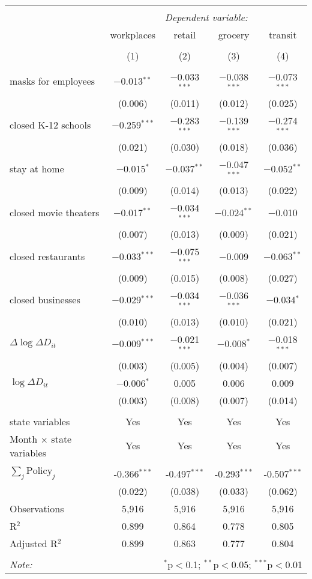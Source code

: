 \begin{tabular}{@{\extracolsep{1pt}}lcccc} 
\\[-1.8ex]\hline 
\hline \\[-1.8ex] 
 & \multicolumn{4}{c}{\textit{Dependent variable:}} \\ 
\cline{2-5} 
 & workplaces & retail & grocery & transit \\ 
\\[-1.8ex] & (1) & (2) & (3) & (4)\\ 
\hline \\[-1.8ex] 
 masks for employees & $-$0.013$^{**}$ & $-$0.033$^{***}$ & $-$0.038$^{***}$ & $-$0.073$^{***}$ \\ 
  & (0.006) & (0.011) & (0.012) & (0.025) \\ 
  closed K-12 schools & $-$0.259$^{***}$ & $-$0.283$^{***}$ & $-$0.139$^{***}$ & $-$0.274$^{***}$ \\ 
  & (0.021) & (0.030) & (0.018) & (0.036) \\ 
  stay at home & $-$0.015$^{*}$ & $-$0.037$^{**}$ & $-$0.047$^{***}$ & $-$0.052$^{**}$ \\ 
  & (0.009) & (0.014) & (0.013) & (0.022) \\ 
  closed movie theaters & $-$0.017$^{**}$ & $-$0.034$^{***}$ & $-$0.024$^{**}$ & $-$0.010 \\ 
  & (0.007) & (0.013) & (0.009) & (0.021) \\ 
  closed restaurants & $-$0.033$^{***}$ & $-$0.075$^{***}$ & $-$0.009 & $-$0.063$^{**}$ \\ 
  & (0.009) & (0.015) & (0.008) & (0.027) \\ 
  closed businesses & $-$0.029$^{***}$ & $-$0.034$^{***}$ & $-$0.036$^{***}$ & $-$0.034$^{*}$ \\ 
  & (0.010) & (0.013) & (0.010) & (0.021) \\ 
  $\Delta \log \Delta D_{it}$ & $-$0.009$^{***}$ & $-$0.021$^{***}$ & $-$0.008$^{*}$ & $-$0.018$^{***}$ \\ 
  & (0.003) & (0.005) & (0.004) & (0.007) \\ 
  $\log \Delta D_{it}$ & $-$0.006$^{*}$ & 0.005 & 0.006 & 0.009 \\ 
  & (0.003) & (0.008) & (0.007) & (0.014) \\ 
 \hline \\[-1.8ex] 
state variables & Yes & Yes & Yes & Yes \\ 
Month $\times$ state variables & Yes & Yes & Yes & Yes \\ 
\hline \\[-1.8ex] 
$\sum_j \mathrm{Policy}_j$ & -0.366$^{***}$ & -0.497$^{***}$ & -0.293$^{***}$ & -0.507$^{***}$ \\ 
 & (0.022) & (0.038) & (0.033) & (0.062) \\ 
Observations & 5,916 & 5,916 & 5,916 & 5,916 \\ 
R$^{2}$ & 0.899 & 0.864 & 0.778 & 0.805 \\ 
Adjusted R$^{2}$ & 0.899 & 0.863 & 0.777 & 0.804 \\ 
\hline 
\hline \\[-1.8ex] 
\textit{Note:}  & \multicolumn{4}{r}{$^{*}$p$<$0.1; $^{**}$p$<$0.05; $^{***}$p$<$0.01} \\ 
\end{tabular} 
